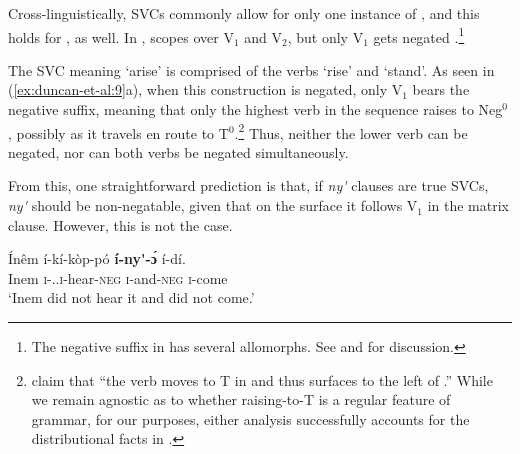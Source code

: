 \documentclass[output=paper,modfonts,nonflat,
colorlinks, citecolor=brown,
]{langsci/langscibook}
\begin{document}
Cross-linguistically, SVCs commonly allow for only one instance of  \citep{hiraiwa2008object}, and this holds for , as well. In ,  scopes over V$_1$ and V$_2$, but only V$_1$ gets negated \citep{major2015serial}.\footnote{The negative suffix in  has several allomorphs. See \citet[124-127]{akinlabi2003} and \citet[89]{duncan2016parallel} for discussion.}

\ea\label{ex:duncan-et-al:9}
\z
\z

\noindent The SVC meaning `arise' is comprised of the verbs `rise' and `stand'. As seen in (\ref{ex:duncan-et-al:9}a), when this construction is negated, only V$_1$ bears the negative suffix, meaning that only the highest verb in the sequence raises to Neg$^0$ \citep{duncan-toappear}, possibly as it travels en route to T$^0$.\footnote{\citet[120]{baker2010agreement} claim that ``the verb moves to T in  and thus surfaces to the left of .'' While we remain agnostic as to whether raising-to-T is a regular feature of  grammar, for our purposes, either analysis successfully accounts for the distributional facts in .} Thus, neither the lower verb can be negated, nor can both verbs be negated simultaneously. 

From this, one straightforward prediction is that, if \textit{ny\'{\textturnv}\ng} clauses are true SVCs, \textit{ny\'{\textturnv}\ng} should be non-negatable, given that on the surface it follows V$_1$ in the matrix clause. However, this is not the case.

\ea\label{ex:duncan-et-al:10}
\gll \'{I}nêm í-kí-k\`{o}p-pó \textbf{í-ny\'{\textturnv}\ng-\ng \'ɔ} í-dí. \\
Inem \textsc{i}-{\PST.\FOC}.\textsc{i}-hear-\textsc{neg} \textsc{i}-and-\textsc{neg} \textsc{i}-come \\
\glt ‘Inem did not hear it and did not come.’ \citep[86]{essien1985negation}
\z
\end{document}
